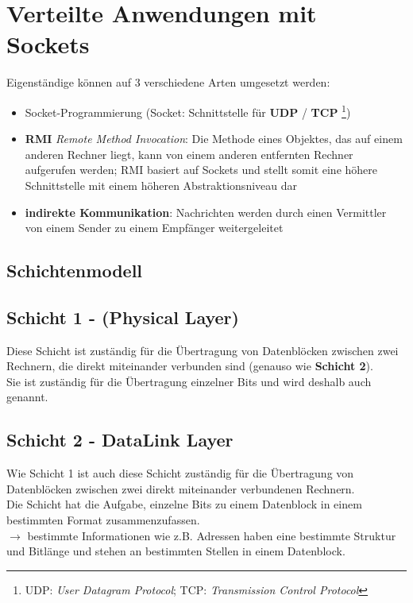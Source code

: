 \section{Verteilte Anwendungen mit Sockets}

Eigenständige  können auf 3 verschiedene Arten umgesetzt werden:

\begin{itemize}
    \item Socket-Programmierung (Socket: Schnittstelle für \textbf{UDP} / \textbf{TCP} \footnote{
    UDP: \textit{User Datagram Protocol}; TCP: \textit{Transmission Control Protocol}
    })
    \item \textbf{RMI} \textit{Remote Method Invocation}: Die Methode eines Objektes, das auf einem anderen Rechner liegt, kann von einem anderen entfernten Rechner aufgerufen werden; RMI basiert auf Sockets und stellt somit eine höhere Schnittstelle mit einem höheren Abstraktionsniveau dar
    \item \textbf{indirekte Kommunikation}: Nachrichten werden durch einen Vermittler von einem Sender zu einem Empfänger weitergeleitet
\end{itemize}


\subsection{Schichtenmodell}

\subsection*{Schicht 1 - (Physical Layer)}

Diese Schicht ist zuständig für die Übertragung von Datenblöcken zwischen zwei Rechnern, die direkt miteinander verbunden sind (genauso wie \textbf{Schicht 2}).\\
Sie ist zuständig für die Übertragung einzelner Bits und wird deshalb auch  genannt.

\subsection*{Schicht 2 - DataLink Layer}

\noindent
Wie Schicht 1 ist auch diese Schicht zuständig für die Übertragung von Datenblöcken zwischen zwei direkt miteinander verbundenen Rechnern.\\

\noindent
Die Schicht hat die Aufgabe, einzelne Bits zu einem Datenblock in einem bestimmten Format zusammenzufassen.\\
$\rightarrow$ bestimmte Informationen wie z.B. Adressen haben eine bestimmte Struktur und Bitlänge und stehen an bestimmten Stellen in einem Datenblock.\\

